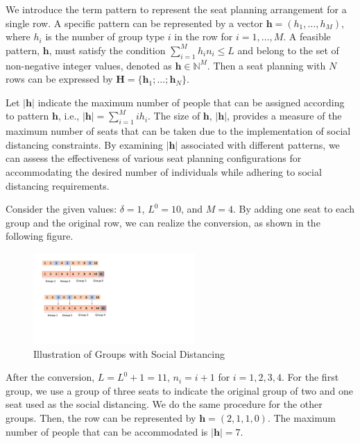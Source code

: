 We introduce the term pattern to represent the seat planning arrangement for a single row. A specific pattern can be represented by a vector $\bm{h} = (h_1, \ldots, h_M)$, where $h_i$ is the number of group type $i$ in the row for $i = 1,\ldots, M$. A feasible pattern, $\bm{h}$, must satisfy the condition $\sum_{i=1}^{M} h_i n_i \leq L$ and belong to the set of non-negative integer values, denoted as $\bm{h} \in \mathbb{N}^{M}$. Then a seat planning with $N$ rows can be expressed by $\bm{H} = \{\bm{h}_1; \ldots; \bm{h}_N\}$.
  
Let $|\bm{h}|$ indicate the maximum number of people that can be assigned according to pattern $\bm{h}$, i.e., $|\bm{h}| = \sum_{i =1}^{M} i h_i$. The size of $\bm{h}$, $|\bm{h}|$, provides a measure of the maximum number of seats that can be taken due to the implementation of social distancing constraints. By examining $|\bm{h}|$ associated with different patterns, we can assess the effectiveness of various seat planning configurations for accommodating the desired number of individuals while adhering to social distancing requirements.

\begin{example}
Consider the given values: $\delta = 1$, $L^{0} = 10$, and $M = 4$. By adding one seat to each group and the original row, we can realize the conversion, as shown in the following figure.

\begin{figure}[ht]
    \centering
        \includegraphics[width=0.55\textwidth]{./Figures/illustration.pdf}
    \caption{Illustration of Groups with Social Distancing}
\end{figure}

After the conversion, $L = L^{0} + 1 =11$, $n_i = i + 1$ for $i = 1, 2, 3, 4$. For the first group, we use a group of three seats to indicate the original group of two and one seat used as the social distancing. We do the same procedure for the other groups. Then, the row can be represented by $\bm{h} = (2,1,1,0)$. The maximum number of people that can be accommodated is $|\bm{h}| = 7$.
\end{example}


